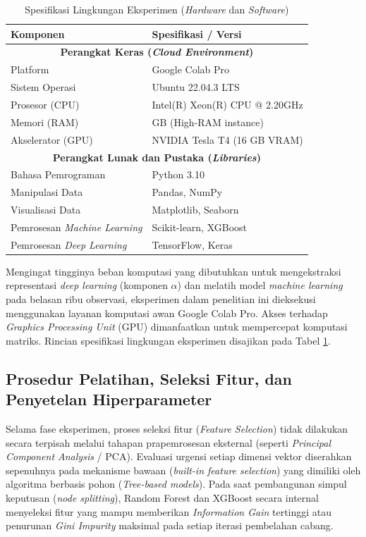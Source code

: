 \begin{table}[htbp]
    \centering
    \footnotesize
    \caption{Spesifikasi Lingkungan Eksperimen (\textit{Hardware} dan \textit{Software})}
    \label{tab:lingkungan_eksperimen}
    \begin{tabular}{ll}
        \toprule
        \textbf{Komponen} & \textbf{Spesifikasi / Versi} \\
        \midrule
        \multicolumn{2}{c}{\textbf{Perangkat Keras (\textit{Cloud Environment})}} \\
        \midrule
        Platform & Google Colab Pro \\
        Sistem Operasi & Ubuntu 22.04.3 LTS \\
        Prosesor (CPU) & Intel(R) Xeon(R) CPU @ 2.20GHz \\
        Memori (RAM) & \textpm 51 GB (High-RAM instance) \\
        Akselerator (GPU) & NVIDIA Tesla T4 (16 GB VRAM) \\
        \midrule
        \multicolumn{2}{c}{\textbf{Perangkat Lunak dan Pustaka (\textit{Libraries})}} \\
        \midrule
        Bahasa Pemrograman & Python 3.10 \\
        Manipulasi Data & Pandas, NumPy \\
        Visualisasi Data & Matplotlib, Seaborn \\
        Pemrosesan \textit{Machine Learning} & Scikit-learn, XGBoost \\
        Pemrosesan \textit{Deep Learning} & TensorFlow, Keras \\
        \bottomrule
    \end{tabular}%
\end{table}

Mengingat tingginya beban komputasi yang dibutuhkan untuk mengekstraksi representasi \textit{deep learning} (komponen $\alpha$) dan melatih model \textit{machine learning} pada belasan ribu observasi, eksperimen dalam penelitian ini dieksekusi menggunakan layanan komputasi awan Google Colab Pro. Akses terhadap \textit{Graphics Processing Unit} (GPU) dimanfaatkan untuk mempercepat komputasi matriks. Rincian spesifikasi lingkungan eksperimen disajikan pada Tabel \ref{tab:lingkungan_eksperimen}.

\subsection{Prosedur Pelatihan, Seleksi Fitur, dan Penyetelan Hiperparameter}
Selama fase eksperimen, proses seleksi fitur (\textit{Feature Selection}) tidak dilakukan secara terpisah melalui tahapan prapemrosesan eksternal (seperti \textit{Principal Component Analysis} / PCA). Evaluasi urgensi setiap dimensi vektor diserahkan sepenuhnya pada mekanisme bawaan (\textit{built-in feature selection}) yang dimiliki oleh algoritma berbasis pohon (\textit{Tree-based models}). Pada saat pembangunan simpul keputusan (\textit{node splitting}), Random Forest dan XGBoost secara internal menyeleksi fitur yang mampu memberikan \textit{Information Gain} tertinggi atau penurunan \textit{Gini Impurity} maksimal pada setiap iterasi pembelahan cabang.

